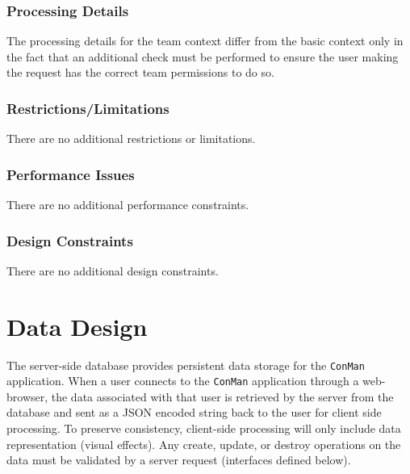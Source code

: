 \documentclass{article}
\begin{document}
\subsubsection{Processing Details}
The processing details for the team context differ from the basic context only in the fact that an additional check must be performed to ensure the user making the request has the correct team permissions to do so.
\subsubsection{Restrictions/Limitations}
There are no additional restrictions or limitations.
\subsubsection{Performance Issues}
There are no additional performance constraints.
\subsubsection{Design Constraints}
There are no additional design constraints.

%
%
%
%


\newpage
\section{Data Design}
The server-side database provides persistent data storage for the \texttt{ConMan} application.
When a user connects to the \texttt{ConMan} application through a web-browser, the data associated with that user is retrieved by the server from the database and sent as a JSON encoded string back to the user for client side processing.
To preserve consistency, client-side processing will only include data representation (visual effects).
Any create, update, or destroy operations on the data must be validated by a server request (interfaces defined below).
\end{document}
